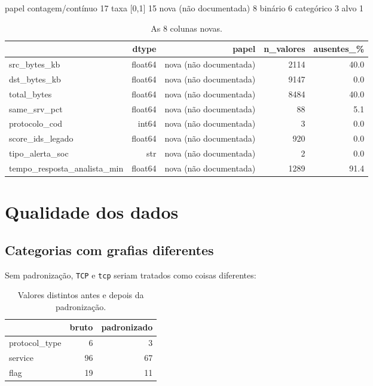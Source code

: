 \documentclass[11pt,a4paper]{article}
\begin{document}
\begin{saida}
papel
contagem/contínuo         17
taxa [0,1]                15
nova (não documentada)     8
binário                    6
categórico                 3
alvo                       1
\end{saida}

\begin{table}[H]
\centering
\caption{As 8 colunas novas.}
\begin{adjustbox}{max width=\linewidth}
\begin{tabular}{lrrrr}
\toprule
 & dtype & papel & n\_valores & ausentes\_\% \\
\midrule
src\_bytes\_kb & float64 & nova (não documentada) & 2114 & 40.0 \\
dst\_bytes\_kb & float64 & nova (não documentada) & 9147 & 0.0 \\
total\_bytes & float64 & nova (não documentada) & 8484 & 40.0 \\
same\_srv\_pct & float64 & nova (não documentada) & 88 & 5.1 \\
protocolo\_cod & int64 & nova (não documentada) & 3 & 0.0 \\
score\_ids\_legado & float64 & nova (não documentada) & 920 & 0.0 \\
tipo\_alerta\_soc & str & nova (não documentada) & 2 & 0.0 \\
tempo\_resposta\_analista\_min & float64 & nova (não documentada) & 1289 & 91.4 \\
\bottomrule
\end{tabular}
\end{adjustbox}
\end{table}

\section{Qualidade dos dados}

\subsection{Categorias com grafias diferentes}

Sem padronização, \texttt{TCP} e \texttt{tcp} seriam tratados como coisas diferentes:

\begin{table}[H]
\centering
\caption{Valores distintos antes e depois da padronização.}
\begin{adjustbox}{max width=\linewidth}
\begin{tabular}{lrr}
\toprule
 & bruto & padronizado \\
\midrule
protocol\_type & 6 & 3 \\
service & 96 & 67 \\
flag & 19 & 11 \\
\bottomrule
\end{tabular}
\end{adjustbox}
\end{table}
\end{document}
